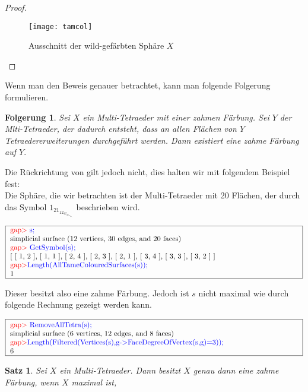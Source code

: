 \documentclass[12pt,titlepage,twoside,cleardoublepage]{article}
\theoremstyle{nummermitklammern}
\newtheorem{folgerung}[temp]{Folgerung}
\newtheorem{satz}[temp]{Satz}
\newtheorem{folgerung}[zahl]{Folgerung}
\newtheorem{satz}[zahl]{Satz}
\numberwithin{equation}{section}
\begin{document}
\begin{proof}
\begin{figure}[H]
\begin{center}
\texttt{[image: tamcol]}
\end{center}
\caption{Ausschnitt der wild-gefärbten Sphäre $X$}
\end{figure}
\end{proof}
Wenn man den Beweis genauer betrachtet, kann man folgende Folgerung formulieren.
\begin{folgerung}
Sei $X$ ein Multi-Tetraeder mit einer zahmen Färbung. Sei $Y$ der Mlti-Tetraeder, der dadurch entsteht, dass an allen Flächen von $Y$ Tetraedererweiterungen durchgeführt werden. Dann existiert eine zahme Färbung auf $Y.$
\end{folgerung}
Die Rückrichtung von  gilt jedoch nicht, dies halten wir mit folgendem Beispiel fest:\\
Die Sphäre, die wir betrachten ist der Multi-Tetraeder mit 20 Flächen, der durch das Symbol $1_21_12_42_32_13_43_33_2$ beschrieben wird.
\begin{center}
$\fbox{
\parbox{14cm}{
\textcolor{red}{gap$>$} \textcolor{blue}{s;}\newline
simplicial surface (12 vertices, 30 edges, and 20 faces)\newline
\textcolor{red}{gap$>$} \textcolor{blue}{GetSymbol(s);}\newline
[ [ 1, 2 ], [ 1, 1 ], [ 2, 4 ], [ 2, 3 ], [ 2, 1 ], [ 3, 4 ], [ 3, 3 ],
  [ 3, 2 ] ]\newline
\textcolor{red}{gap$>$}\textcolor{blue}{ Length(AllTameColouredSurfaces(s));}\newline
1
}}$
\end{center}
Dieser besitzt also eine zahme Färbung. Jedoch ist $s$ nicht maximal wie durch folgende Rechnung gezeigt werden kann.
\begin{center}
$\fbox{
\parbox{14cm}{
\textcolor{red}{gap$>$} \textcolor{blue}{RemoveAllTetra(s);}\newline
simplicial surface (6 vertices, 12 edges, and 8 faces)\newline
\textcolor{red}{gap$>$}\textcolor{blue}{ Length(Filtered(Vertices(s),g->FaceDegreeOfVertex(s,g)=3));}\newline
6
}}$
\end{center}
\begin{satz}
Sei $X$ ein Multi-Tetraeder. Dann besitzt $X$ genau dann eine zahme Färbung, wenn $X$ maximal ist,
\end{satz}
\end{document}
